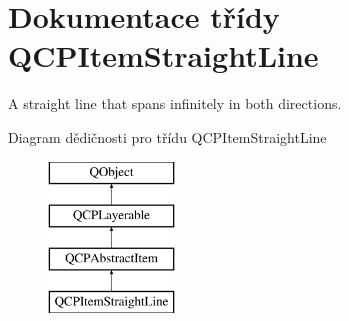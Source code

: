 \hypertarget{classQCPItemStraightLine}{}\section{Dokumentace třídy Q\+C\+P\+Item\+Straight\+Line}
\label{classQCPItemStraightLine}


A straight line that spans infinitely in both directions.  


Diagram dědičnosti pro třídu Q\+C\+P\+Item\+Straight\+Line\begin{figure}[H]
\begin{center}
\leavevmode
\includegraphics[height=4.000000cm]{classQCPItemStraightLine}
\end{center}
\end{figure}
